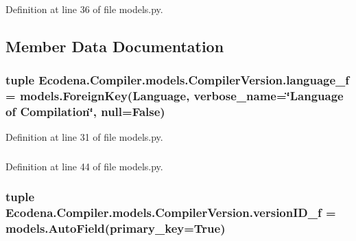 Definition at line 36 of file models.py.



\subsection{Member Data Documentation}
\hypertarget{class_ecodena_1_1_compiler_1_1models_1_1_compiler_version_a1ae530279bdfebe2e9fbed403cbc89fc}{
\subsubsection[{language\_\-f}]{\setlength{\rightskip}{0pt plus 5cm}tuple {\bf Ecodena.Compiler.models.CompilerVersion.language\_\-f} = models.ForeignKey({\bf Language}, verbose\_\-name=\char`\"{}Language of Compilation\char`\"{}, null=False)}}
\label{d0/d33/class_ecodena_1_1_compiler_1_1models_1_1_compiler_version_a1ae530279bdfebe2e9fbed403cbc89fc}


Definition at line 31 of file models.py.

\hypertarget{class_ecodena_1_1_compiler_1_1models_1_1_compiler_version_a0fee66404857026401c70f1fa579600e}{
\subsubsection[{language\_\-f}]{}}
\label{d0/d33/class_ecodena_1_1_compiler_1_1models_1_1_compiler_version_a0fee66404857026401c70f1fa579600e}


Definition at line 44 of file models.py.

\hypertarget{class_ecodena_1_1_compiler_1_1models_1_1_compiler_version_a16ef12e2574c9d71dd514664e1f90a2a}{
\subsubsection[{versionID\_\-f}]{\setlength{\rightskip}{0pt plus 5cm}tuple {\bf Ecodena.Compiler.models.CompilerVersion.versionID\_\-f} = models.AutoField(primary\_\-key=True)}}
\label{d0/d33/class_ecodena_1_1_compiler_1_1models_1_1_compiler_version_a16ef12e2574c9d71dd514664e1f90a2a}


